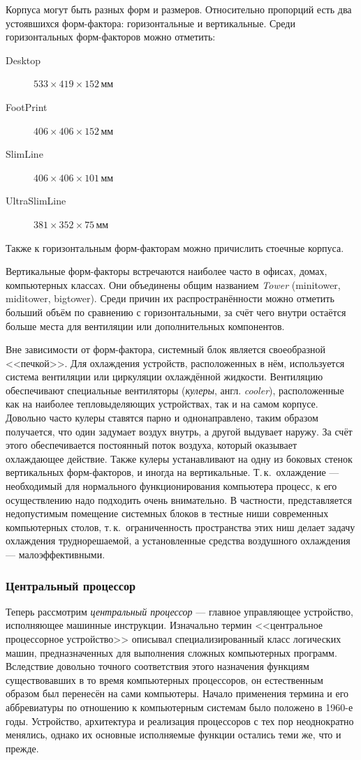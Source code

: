 Корпуса могут быть разных форм и размеров. Относительно пропорций есть два устоявшихся форм-фактора: горизонтальные и вертикальные. Среди горизонтальных форм-факторов можно отметить:
\begin{description}
 \item[Desktop] $533\times419\times152$\,мм
 \item[FootPrint] $406\times406\times152$\,мм
 \item[SlimLine] $406\times406\times101$\,мм
 \item[UltraSlimLine] $381\times352\times75$\,мм
\end{description}
Также к горизонтальным форм-факторам можно причислить стоечные корпуса.

Вертикальные форм-факторы встречаются наиболее часто в офисах, домах, компьютерных классах. Они объединены общим названием \emph{Tower} (minitower, miditower, bigtower). Среди причин их распространённости можно отметить больший объём по сравнению с горизонтальными, за счёт чего внутри остаётся больше места для вентиляции или дополнительных компонентов.

Вне зависимости от форм-фактора, системный блок является своеобразной <<печкой>>. Для охлаждения устройств, расположенных в нём, используется система вентиляции или циркуляции охлаждённой жидкости. Вентиляцию обеспечивают специальные вентиляторы (\emph{кулеры}, англ. \emph{cooler}), расположенные как на наиболее тепловыделяющих уст\-ройствах, так и на самом корпусе.
Довольно часто кулеры ставятся парно и однонаправлено, таким образом получается, что один задумает воздух внутрь, а другой выдувает наружу. За счёт этого обеспечивается постоянный поток воздуха, который оказывает охлаждающее действие.
Также кулеры устанавливают на одну из боковых стенок вертикальных форм-факторов, и иногда на вертикальные. Т.\,к.~охлаждение --- необходимый для нормального функционирования компьютера процесс, к его осуществлению надо подходить очень внимательно.
В частности, представляется недопустимым помещение системных блоков в тестные ниши современных компьютерных столов, т.\,к.~ограниченность пространства этих ниш делает задачу охлаждения труднорешаемой, а установленные средства воздушного охлаждения --- малоэффективными.

\subsubsection{Центральный процессор}\label{base:introduction:components:cpu}
Теперь рассмотрим \emph{центральный процессор} --- главное управляющее устройство, исполняющее машинные инструкции.
Изначально термин <<центральное процессорное устройство>> описывал специализированный класс логических машин, предназначенных для выполнения сложных компьютерных программ.
Вследствие довольно точного соответствия этого назначения функциям существовавших в то время компьютерных процессоров, он естественным образом был перенесён на сами компьютеры.
Начало применения термина и его аббревиатуры по отношению к компьютерным системам было положено в 1960-е годы.
Устройство, архитектура и реализация процессоров с тех пор неоднократно менялись, однако их основные исполняемые функции остались теми же, что и прежде.

